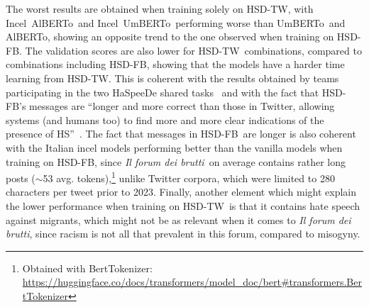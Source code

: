 \documentclass[11pt]{article}
\newcommand{\dsITclassification}{IFS-IT}
\newcommand{\umbert}{\mbox{UmBERTo}}
\newcommand{\albert}{\mbox{AlBERTo}}
\newcommand{\iumbert}{\mbox{Incel UmBERTo}}
\newcommand{\ialbert}{\mbox{Incel AlBERTo}}
\newcommand{\hsdfb}{\mbox{HSD-FB}}
\newcommand{\hsdtw}{\mbox{HSD-TW}}
\newcommand{\itforum}{\textit{Il forum dei brutti}}
\begin{document}
The worst results are obtained when training solely on \hsdtw, with \ialbert\, and \iumbert\, performing worse than \umbert\, and \albert, showing an opposite trend to the one observed when training on \hsdfb.
The validation scores are also lower for \hsdtw\, combinations, compared to combinations including \hsdfb, showing that the models have a harder time learning from \hsdtw. This is coherent with the results obtained by teams participating in the two HaSpeeDe shared tasks~\cite{boscoOverviewEVALITA2018,basileEVALITA2020Overview} and with the fact that \hsdfb's messages are ``longer and more
correct than those in Twitter, allowing systems (and humans too) to find more and more clear indications of the presence of HS''~\cite{boscoOverviewEVALITA2018}.
The fact that messages in \hsdfb\, are longer is also coherent with the Italian incel models performing better than the vanilla models when training on \hsdfb, since \itforum\, on average contains rather long posts
($\sim$53 avg. tokens),\footnote{Obtained with BertTokenizer: \url{https://huggingface.co/docs/transformers/model_doc/bert#transformers.BertTokenizer}} unlike Twitter corpora, which were limited to 280 characters per tweet prior to 2023.
Finally, another element which might explain the lower performance when training on \hsdtw\, is that it contains hate speech against migrants, which might not be as relevant when it comes to \itforum, since racism is not all that prevalent in this forum, compared to misogyny.
\end{document}
